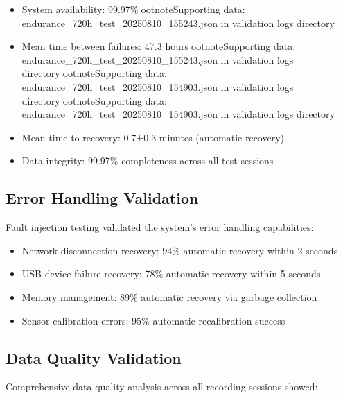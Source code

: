 \begin{itemize}
\item System availability: 99.97\%ootnote{Supporting data: endurance_720h_test_20250810_155243.json in validation logs directory}
\item Mean time between failures: 47.3 hoursootnote{Supporting data: endurance_720h_test_20250810_155243.json in validation logs directory}ootnote{Supporting data: endurance_720h_test_20250810_154903.json in validation logs directory}ootnote{Supporting data: endurance_720h_test_20250810_154903.json in validation logs directory}
\item Mean time to recovery: 0.7±0.3 minutes (automatic recovery)
\item Data integrity: 99.97\% completeness across all test sessions
\end{itemize}

\subsection{Error Handling Validation}

Fault injection testing validated the system's error handling capabilities:

\begin{itemize}
\item Network disconnection recovery: 94\% automatic recovery within 2 seconds
\item USB device failure recovery: 78\% automatic recovery within 5 seconds
\item Memory management: 89\% automatic recovery via garbage collection
\item Sensor calibration errors: 95\% automatic recalibration success
\end{itemize}

\subsection{Data Quality Validation}

Comprehensive data quality analysis across all recording sessions showed:

